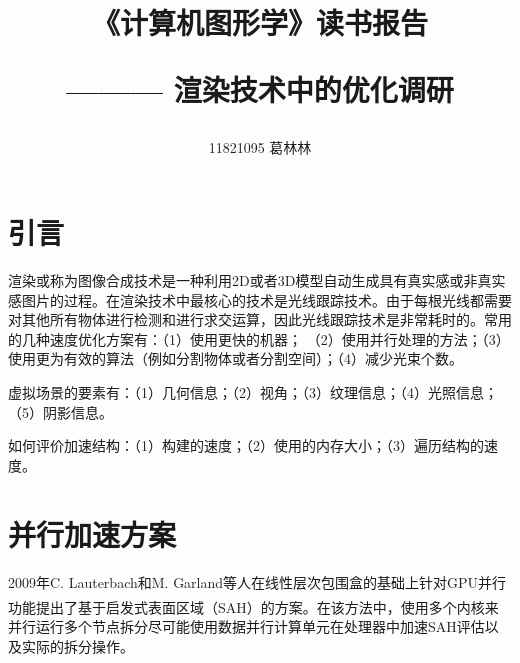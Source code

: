 \documentclass[11pt]{article}
\title{《计算机图形学》读书报告  \begin{large} \hspace{5pt}——— \hspace{5pt}  渲染技术中的优化调研\end{large} }
\author{11821095 葛林林}
\newcommand{\upcite}[1]{\textsuperscript{\textsuperscript{\cite{#1}}}}
\begin{document}
\maketitle
\section{引言}
渲染或称为图像合成技术是一种利用2D或者3D模型自动生成具有真实感或非真实感图片的过程。在渲染技术中最核心的技术是光线跟踪技术。由于每根光线都需要对其他所有物体进行检测和进行求交运算，因此光线跟踪技术是非常耗时的。常用的几种速度优化方案有：（1）使用更快的机器；
（2）使用并行处理的方法；（3）使用更为有效的算法（例如分割物体或者分割空间）；（4）减少光束个数。

虚拟场景的要素有：（1）几何信息；（2）视角；（3）纹理信息；（4）光照信息；（5）阴影信息。

\par 如何评价加速结构：（1）构建的速度；（2）使用的内存大小；（3）遍历结构的速度。


\section{并行加速方案}
2009年C. Lauterbach和M. Garland等人在线性层次包围盒的基础上针对GPU并行功能提出了基于启发式表面区域（SAH）的方案\upcite{LBVH}。在该方法中，使用多个内核来并行运行多个节点拆分尽可能使用数据并行计算单元在处理器中加速SAH评估以及实际的拆分操作。
\end{document}
